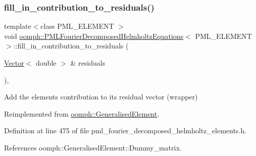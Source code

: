 \subsubsection{\texorpdfstring{fill\+\_\+in\+\_\+contribution\+\_\+to\+\_\+residuals()}{fill\_in\_contribution\_to\_residuals()}}
{\footnotesize\ttfamily template$<$class P\+M\+L\+\_\+\+E\+L\+E\+M\+E\+NT $>$ \\
void \hyperlink{classoomph_1_1PMLFourierDecomposedHelmholtzEquations}{oomph\+::\+P\+M\+L\+Fourier\+Decomposed\+Helmholtz\+Equations}$<$ P\+M\+L\+\_\+\+E\+L\+E\+M\+E\+NT $>$\+::fill\+\_\+in\+\_\+contribution\+\_\+to\+\_\+residuals (\begin{DoxyParamCaption}\item[{\hyperlink{classoomph_1_1Vector}{Vector}$<$ double $>$ \&}]{residuals }\end{DoxyParamCaption})\hspace{0.3cm}{\ttfamily [inline]}, {\ttfamily [virtual]}}



Add the element\textquotesingle{}s contribution to its residual vector (wrapper) 



Reimplemented from \hyperlink{classoomph_1_1GeneralisedElement_a310c97f515e8504a48179c0e72c550d7}{oomph\+::\+Generalised\+Element}.



Definition at line 475 of file pml\+\_\+fourier\+\_\+decomposed\+\_\+helmholtz\+\_\+elements.\+h.



References oomph\+::\+Generalised\+Element\+::\+Dummy\+\_\+matrix.

\mbox{\label{classoomph_1_1PMLFourierDecomposedHelmholtzEquations_a8e8c4b39e2bd4a75b4d71dc92c5c0352}} 
